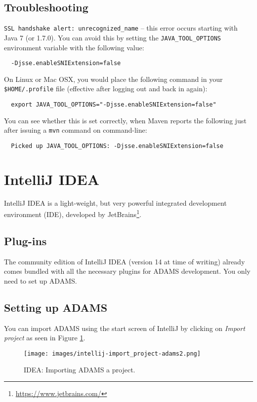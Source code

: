 \subsection{Troubleshooting}
\begin{tight_itemize}
  \item \texttt{SSL handshake alert: unrecognized\_name} -- this error occurs starting with Java 7 (or 1.7.0). You can avoid this by setting the \texttt{JAVA\_TOOL\_OPTIONS} environment variable with the following value:
  \begin{verbatim}
  -Djsse.enableSNIExtension=false
  \end{verbatim}
  On Linux or Mac OSX, you would place the following command in your \texttt{\$HOME/.profile} file (effective after logging out and back in again):
  \begin{verbatim}
  export JAVA_TOOL_OPTIONS="-Djsse.enableSNIExtension=false"
  \end{verbatim}
  You can see whether this is set correctly, when Maven reports the following just after issuing a \texttt{mvn} command on command-line:
  \begin{verbatim}
  Picked up JAVA_TOOL_OPTIONS: -Djsse.enableSNIExtension=false
  \end{verbatim}
\end{tight_itemize}

\clearpage
\section{IntelliJ IDEA}
IntelliJ IDEA\cite{intellij} is a light-weight, but very powerful integrated
development environment (IDE), developed by JetBrains\footnote{\url{https://www.jetbrains.com/}{}}.

\subsection{Plug-ins}
The community edition of IntelliJ IDEA (version 14 at time of writing) already
comes bundled with all the necessary plugins for ADAMS development. You only
need to set up ADAMS.

\subsection{Setting up ADAMS}
You can import ADAMS using the start screen of IntelliJ by clicking on
\textit{Import project} as seen in Figure \ref{intellij-import_project-adams2}.
\begin{figure}[htb]
  \centering
  \texttt{[image: images/intellij-import\_project-adams2.png]}
  \caption{IDEA: Importing ADAMS a project.}
  \label{intellij-import_project-adams2}
\end{figure}

